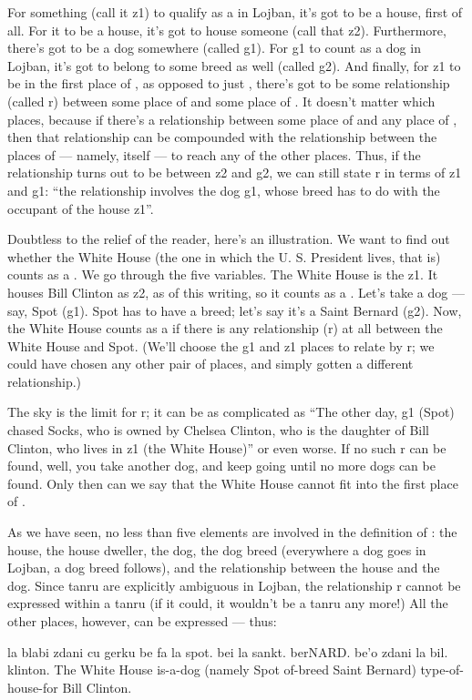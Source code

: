 For something (call it z1) to qualify as a 
    in Lojban, it's got to be a house, first of all. For it to be a
    house, it's got to house someone (call that z2). Furthermore,
    there's got to be a dog somewhere (called g1). For g1 to count
    as a dog in Lojban, it's got to belong to some breed as well
    (called g2). And finally, for z1 to be in the first place of
    , as opposed to just , there's got to
    be some relationship (called r) between some place of 
    and some place of . It doesn't matter which places,
    because if there's a relationship between some place of
     and any place of , then that relationship
    can be compounded with the relationship between the places of
     --- namely,  itself --- to reach any of the
    other  places. Thus, if the relationship turns out to
    be between z2 and g2, we can still state r in terms of z1 and
    g1: ``the relationship involves the dog g1, whose breed has to
    do with the occupant of the house z1''.

Doubtless to the relief of the reader, here's an
    illustration. We want to find out whether the White House (the
    one in which the U. S. President lives, that is) counts as a
    . We go through the five variables. The White
    House is the z1. It houses Bill Clinton as z2, as of this
    writing, so it counts as a . Let's take a dog --- say,
    Spot (g1). Spot has to have a breed; let's say it's a Saint
    Bernard (g2). Now, the White House counts as a 
    if there is any relationship (r) at all between the White House
    and Spot. (We'll choose the g1 and z1 places to relate by r; we
    could have chosen any other pair of places, and simply gotten a
    different relationship.)

The sky is the limit for r; it can be as complicated as
    ``The other day, g1 (Spot) chased Socks, who is owned by
    Chelsea Clinton, who is the daughter of Bill Clinton, who lives
    in z1 (the White House)'' or even worse. If no such r can be
    found, well, you take another dog, and keep going until no more
    dogs can be found. Only then can we say that the White House
    cannot fit into the first place of .

As we have seen, no less than five elements are involved in
    the definition of : the house, the house
    dweller, the dog, the dog breed (everywhere a dog goes in
    Lojban, a dog breed follows), and the relationship between the
    house and the dog. Since tanru are explicitly ambiguous in
    Lojban, the relationship r cannot be expressed within a tanru
    (if it could, it wouldn't be a tanru any more!) All the other
    places, however, can be expressed --- thus:
\begin{example}
la blabi zdani cu gerku be fa la spot.\n
\T	bei la sankt. berNARD. be'o\n
\T	zdani la bil. klinton.\n
The White House is-a-dog (namely Spot\n
\T	of-breed Saint Bernard)\n
\T	type-of-house-for Bill Clinton.
\end{example}

